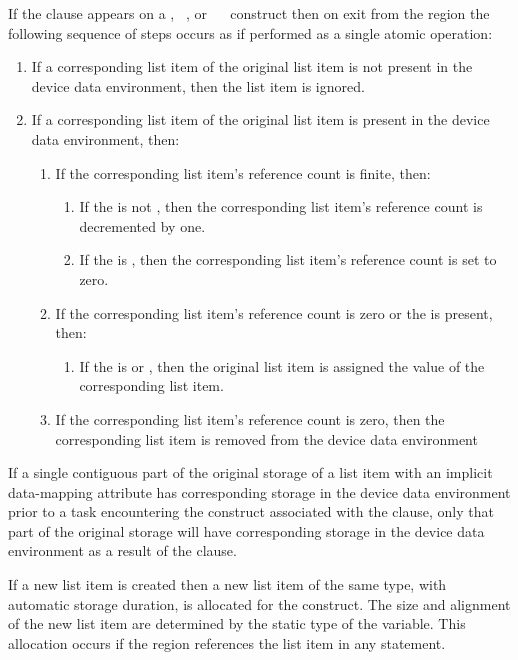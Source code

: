 {{{{If the  clause appears on a , ~, or ~~ construct then on exit from the region the following sequence of steps occurs as if performed as a single atomic operation:
\begin{enumerate}
\item If a corresponding list item of the original list item is not present in the device data environment, then the list item is ignored.
\item If a corresponding list item of the original list item is present in the device data environment, then:
\begin{enumerate}
\item If the corresponding list item's reference count is finite, then:
\begin{enumerate}
\item If the  is not , then the corresponding list item's reference count is decremented by one.
\item If the  is , then the corresponding list item's reference count is set to zero. 
\end{enumerate}
\item If the corresponding list item's reference count is zero or the   is present, then:
\begin{enumerate}
\item If the  is  or , then the original list item is assigned the value of the corresponding list item. 
\end{enumerate}
\item If the corresponding list item's reference count is zero, then the corresponding list item is removed from the device data environment 
\end{enumerate}
\end{enumerate}

If a single contiguous part of the original storage of a list item with an
implicit data-mapping attribute has corresponding storage in the device data
environment prior to a task encountering the construct associated with the
 clause, only that part of the original storage will have
corresponding storage in the device data environment as a result of the 
clause. 

\ccppspecificstart
If a new list item is created then a new list item of the same type, with automatic storage
duration, is allocated for the construct. The size and alignment of the new list
item are determined by the static type of the variable. This allocation occurs if the region
references the list item in any statement.
\ccppspecificend

}}}}
